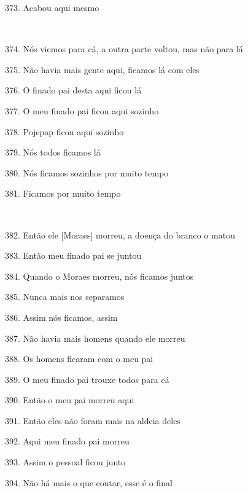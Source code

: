 373. Acabou aqui mesmo

~

374. Nós viemos para cá, a outra parte voltou, mas não para lá

375. Não havia mais gente aqui, ficamos lá com eles

376. O finado pai desta aqui ficou lá

377. O meu finado pai ficou aqui sozinho

378. Pojepap ficou aqui sozinho

379. Nós todos ficamos lá

380. Nós ficamos sozinhos por muito tempo

381. Ficamos por muito tempo

~

382. Então ele {[}Moraes{]} morreu, a doença do branco o matou

383. Então meu finado pai se juntou

384. Quando o Moraes morreu, nós ficamos juntos

385. Nunca mais nos separamos

386. Assim nós ficamos, assim

387. Não havia mais homens quando ele morreu

388. Os homens ficaram com o meu pai

389. O meu finado pai trouxe todos para cá

390. Então o meu pai morreu aqui

391. Então eles não foram mais na aldeia deles

392. Aqui meu finado pai morreu

393. Assim o pessoal ficou junto

394. Não há mais o que contar, esse é o final



